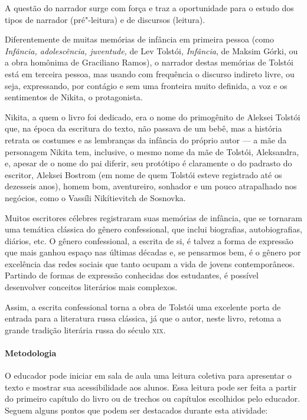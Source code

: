 \documentclass{article}
\begin{document}
A questão do narrador surge com força e traz a oportunidade para o
estudo dos tipos de narrador (pré"-leitura) e de discursos (leitura).

Diferentemente de muitas memórias de infância em primeira pessoa (como
\emph{Infância, adolescência, juventude,} de Lev Tolstói,
\emph{Infância}, de Maksim Górki, ou a obra homônima de Graciliano
Ramos), o narrador destas memórias de Tolstói está em terceira pessoa,
mas usando com frequência o discurso indireto livre, ou seja,
expressando, por contágio e sem uma fronteira muito definida, a voz e os
sentimentos de Nikita, o protagonista.

Nikita, a quem o livro foi dedicado, era o nome do primogênito de
Aleksei Tolstói que, na época da escritura do texto, não passava de um
bebê, mas a história retrata os costumes e as lembranças da infância do
próprio autor --- a mãe da personagem Nikita tem, inclusive, o mesmo
nome da mãe de Tolstói, Aleksandra, e, apesar de o nome do pai diferir,
seu protótipo é claramente o do padrasto do escritor, Aleksei Bostrom
(em nome de quem Tolstói esteve registrado até os dezesseis anos), homem
bom, aventureiro, sonhador e um pouco atrapalhado nos negócios, como o
Vassíli Nikítievitch de Sosnovka.

Muitos escritores célebres registraram suas memórias de infância, que se
tornaram uma temática clássica do gênero confessional, que inclui
biografias, autobiografias, diários, etc. O gênero confessional, a
escrita de si, é talvez a forma de expressão que mais ganhou espaço nas
últimas décadas e, se pensarmos bem, é o gênero por excelência das redes
sociais que tanto ocupam a vida de jovens contemporâneos. Partindo de
formas de expressão conhecidas dos estudantes, é possível desenvolver
conceitos literários mais complexos.

Assim, a escrita confessional torna a obra de Tolstói uma excelente
porta de entrada para a literatura russa clássica, já que o autor, neste
livro, retoma a grande tradição literária russa do século \textsc{xix}.

\paragraph{Metodologia}
O educador pode iniciar em sala de aula uma leitura coletiva para
apresentar o texto e mostrar sua acessibilidade aos alunos. Essa leitura
pode ser feita a partir do primeiro capítulo do livro ou de trechos ou
capítulos escolhidos pelo educador. Seguem alguns pontos que podem ser
destacados durante esta atividade:
\end{document}

